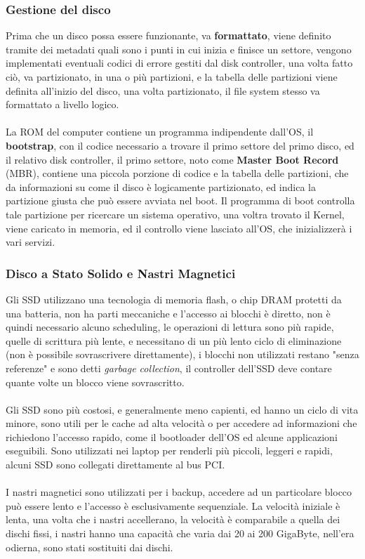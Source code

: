 \documentclass[12pt, letterpaper]{article}
\newcommand{\acc}{\\\hphantom{}\\}
\begin{document}
\subsubsection{Gestione del disco} 
Prima che un disco possa essere funzionante, va \textbf{formattato}, viene definito tramite dei metadati quali sono 
i punti in cui inizia e finisce un settore, vengono implementati eventuali codici di errore gestiti dal disk 
controller, una volta fatto ciò, va partizionato, in una o più partizioni, e la tabella delle partizioni viene 
definita all'inizio del disco, una volta partizionato, il file system stesso va formattato a livello logico.\acc 
La ROM del computer contiene un programma indipendente dall'OS, il \textbf{bootstrap}, con il codice necessario 
a trovare il primo settore del primo disco, ed il relativo disk controller, il primo settore, noto come \textbf{Master 
Boot Record} (MBR), contiene una piccola porzione di codice e la tabella delle partizioni, che da informazioni su come 
il disco è logicamente partizionato, ed indica la partizione giusta che può essere avviata nel boot. Il programma di boot controlla 
tale partizione per ricercare un sistema operativo, una voltra trovato il Kernel, viene caricato in memoria, ed il 
controllo viene lasciato all'OS, che inizializzerà i vari servizi.
\subsubsection{Disco a Stato Solido e Nastri Magnetici}
Gli SSD utilizzano una tecnologia di memoria flash, o chip DRAM protetti da una batteria, non ha parti meccaniche 
e l'accesso ai blocchi è diretto, non è quindi necessario alcuno scheduling, le operazioni di lettura sono più rapide, quelle 
di scrittura più lente, e necessitano di un più lento ciclo di eliminazione (non è possibile sovrascrivere direttamente), 
i blocchi non utilizzati restano "senza referenze" e sono detti \textit{garbage collection}, il controller dell'SSD deve 
contare quante volte un blocco viene sovrascritto.\acc Gli SSD sono più costosi, e generalmente meno capienti, ed hanno 
un ciclo di vita minore, sono utili per le cache ad alta velocità o per accedere ad informazioni che richiedono l'accesso 
rapido, come il bootloader dell'OS ed alcune applicazioni eseguibili. Sono utilizzati nei laptop per renderli 
più piccoli, leggeri e rapidi, alcuni SSD sono collegati direttamente al bus PCI.\acc 
I nastri magnetici sono utilizzati per i backup, accedere ad un particolare blocco può essere lento e l'accesso 
è esclusivamente sequenziale. La velocità iniziale è lenta, una volta che i nastri accellerano, la velocità è comparabile 
a quella dei dischi fissi, i nastri hanno una capacità che varia dai 20 ai 200 GigaByte, nell'era odierna, sono 
stati sostituiti dai dischi.
\end{document}
